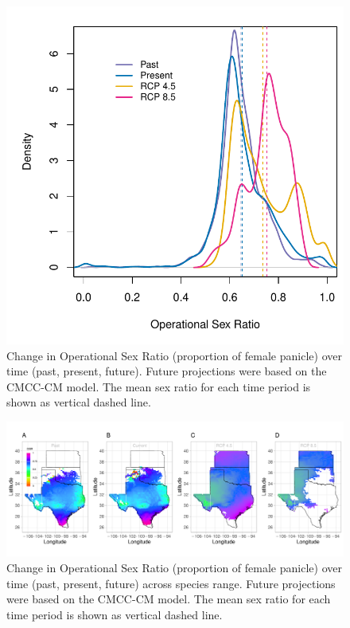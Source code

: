 \documentclass[12pt]{article}\usepackage[]{graphicx}\usepackage[dvipsnames]{xcolor}
\begin{document}
\begin{figure}[H]
	\begin{center}
		\includegraphics[width=0.6\linewidth]{Figures/POAR_OSR.pdf}
		\caption{Change in Operational Sex Ratio (proportion of female panicle) over time (past, present, future).
			Future projections were based on the CMCC-CM model.
			The mean sex ratio for each time period is shown as vertical dashed line.}
		\label{fig:srprojcmc}
	\end{center}
\end{figure}

\begin{figure}[H]
	\begin{center}
		\includegraphics[width=1\linewidth]{Figures/Fig_geo_sr_miroc.pdf}
		\caption{Change in Operational Sex Ratio (proportion of female panicle) over time (past, present, future) across species range.
			Future projections were based on the CMCC-CM model.
			The mean sex ratio for each time period is shown as vertical dashed line.}
		\label{fig:geoosrprojcmc}
	\end{center}
\end{figure}
\end{document}
